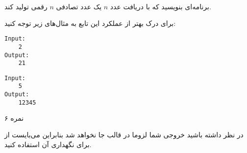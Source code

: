 
برنامه‌ای بنویسید که با دریافت عدد
$n$
یک عدد تصادفی
$n$
رقمی تولید کند.

برای درک بهتر از عملکرد این تابع به مثال‌های زیر توجه کنید:

\begin{latin}
\begin{verbatim}
Input:
    2
Output:
    21
\end{verbatim}
\end{latin}

\begin{latin}
\begin{verbatim}
Input:
    5
Output:
    12345
\end{verbatim}
\end{latin}

۶ نمره

در نظر داشته باشید خروجی شما لزوما در قالب
جا نخواهد شد بنابراین می‌بایست از
برای نگهداری آن استفاده کنید.
